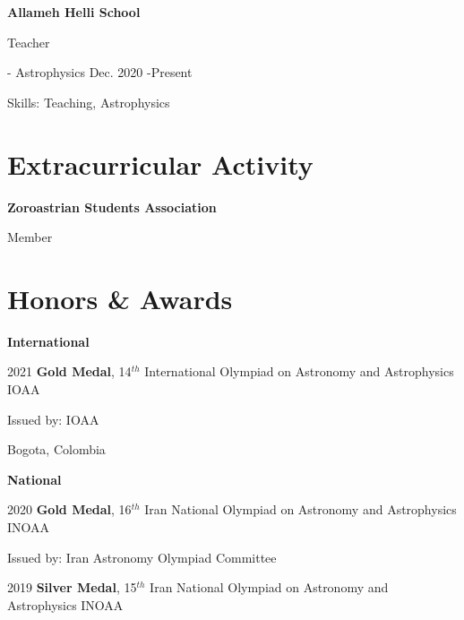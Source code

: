 \documentclass{article}
\begin{document}
\textbf{Allameh Helli School}

\hspace{5mm}
Teacher

\hspace{5mm}
 - Astrophysics \hfill Dec. 2020 -Present

\hspace{5mm}
Skills: Teaching, Astrophysics


\section*{\textcolor{BrickRed}{Ext}racurricular Activity  \noindent\hrulefill}
\textbf{Zoroastrian Students Association}

\hspace{5mm}
Member


\section*{\textcolor{BrickRed}{Hon}ors \& Awards  \noindent\hrulefill}
\textbf{International}

\hspace{5mm}
2021 \hspace{7mm} \textbf{Gold Medal}, 14$^{th}$ International Olympiad on Astronomy and Astrophysics IOAA

\hspace{22mm}
Issued by: IOAA

\hspace{22mm}
Bogota, Colombia

\vspace{5mm}

\textbf{National}

\hspace{5mm}
2020 \hspace{7mm}\textbf{Gold Medal}, 16$^{th}$ Iran National Olympiad on Astronomy and Astrophysics INOAA

\hspace{22mm}
Issued by: Iran Astronomy Olympiad Committee

\vspace{5mm}

\hspace{5mm}
2019 \hspace{7mm} \textbf{Silver Medal}, 15$^{th}$ Iran National Olympiad on Astronomy and Astrophysics INOAA
\end{document}
